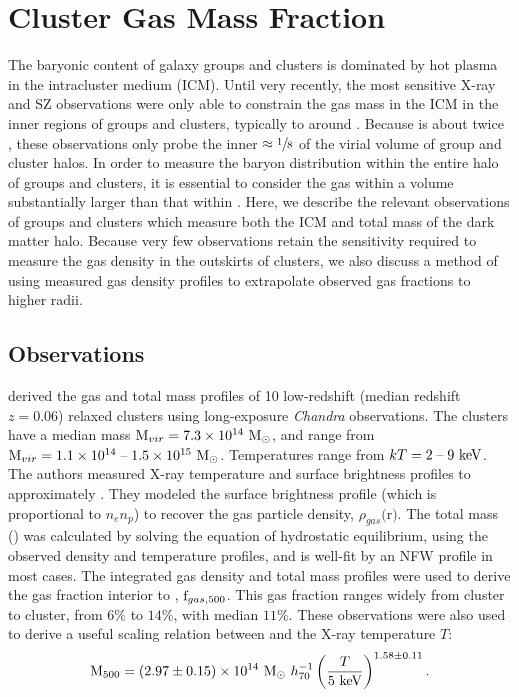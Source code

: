 \section{Cluster Gas Mass Fraction}
\label{sec:Gas}
The baryonic content of galaxy groups and clusters is dominated by hot
plasma in the intracluster medium (ICM). Until very recently, the most
sensitive X-ray and SZ observations were only able to constrain the
gas mass in the ICM in the inner regions of groups and clusters,
typically to around \rfive{} . Because \rvir{} is about twice \rfive{}, these
observations only probe the inner $\approx \sfrac{1}{8}$ of the virial
volume of group and cluster halos. In order to measure the baryon
distribution within the entire halo of groups and clusters, it is
essential to consider the gas within a volume substantially larger
than that within \rfive{}. Here, we describe the relevant observations
of groups and clusters which measure both the ICM and total mass of
the dark matter halo. Because very few observations retain the
sensitivity required to measure the gas density in the outskirts of
clusters, we also discuss a method of using measured gas density
profiles to extrapolate observed gas fractions to higher radii.

\subsection{Observations}
\label{sec:Gas.Observations}
\textbf{\citet{Vikhlinin2006}} derived the gas and total mass profiles
of 10 low-redshift (median redshift $z = 0.06$) relaxed clusters using
long-exposure \textit{Chandra} observations. The clusters have a
median mass $\textrm{M\ensuremath{_{vir}}} = 7.3 \times 10^{14}~\textrm{M}_\odot$, and range from $\textrm{M\ensuremath{_{vir}}} =
1.1\times 10^{14}\;\textrm{--}\;1.5 \times 10^{15}~\textrm{M}_\odot$. Temperatures range from
$kT = 2\;\textrm{--}\;9~\textrm{keV}$. The authors measured X-ray temperature
and surface brightness profiles to approximately \rfive{}. They
modeled the surface brightness profile (which is proportional to
$n_en_p$) to recover the gas particle density,
$\rho_{gas}($r$)$. The total mass (\Mfive) was calculated by solving the
equation of hydrostatic equilibrium, using the observed density and
temperature profiles, and is well-fit by an NFW profile in most
cases. The integrated gas density and total mass profiles were used to
derive the gas fraction interior to \rfive{}, $\textrm{f\ensuremath{_{gas,500}}}$. This gas
fraction ranges widely from cluster to cluster, from $6\%$ to $14\%$,
with median $11\%$. These observations were also used to derive a
useful scaling relation between \Mfive{} and the X-ray temperature $T$:
\begin{equation}
\label{eq:M-T}
\textrm{M\ensuremath{_{500}}}{} = (2.97 \pm 0.15)\times 10^{14}~\textrm{M}_\odot~h_{70}^{-1}
\left(\frac{T}{5~\textrm{keV}}\right)^{1.58 \pm 0.11}.
\end{equation}

